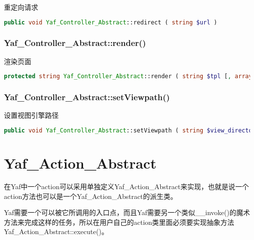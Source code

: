 重定向请求

\begin{lstlisting}[language=PHP]
public void Yaf_Controller_Abstract::redirect ( string $url )
\end{lstlisting}

\subsection{Yaf\_Controller\_Abstract::render()}

渲染页面


\begin{lstlisting}[language=PHP]
protected string Yaf_Controller_Abstract::render ( string $tpl [, array $parameters ] )
\end{lstlisting}

\subsection{Yaf\_Controller\_Abstract::setViewpath()}

设置视图引擎路径



\begin{lstlisting}[language=PHP]
public void Yaf_Controller_Abstract::setViewpath ( string $view_directory )
\end{lstlisting}



\chapter{Yaf\_Action\_Abstract}


在Yaf中一个action可以采用单独定义Yaf\_Action\_Abstract来实现，也就是说一个action方法也可以是一个Yaf\_Action\_Abstract的派生类。



Yaf需要一个可以被它所调用的入口点，而且Yaf需要另一个类似\_\_invoke()的魔术方法来完成这样的任务，所以在用户自己的action类里面必须要实现抽象方法 Yaf\_Action\_Abstract::execute()。



